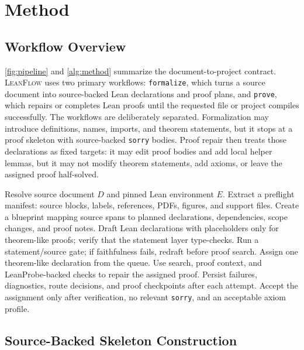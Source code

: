 \documentclass{article}
\newcommand{\method}{\textsc{LeanFlow}\xspace}
\newcommand{\lean}{Lean\xspace}
\begin{document}
\section{Method}

\subsection{Workflow Overview}

\cref{fig:pipeline} and \cref{alg:method} summarize the document-to-project contract.
\method uses two primary workflows: \texttt{formalize}, which turns a source document into source-backed \lean declarations and proof plans, and \texttt{prove}, which repairs or completes \lean proofs until the requested file or project compiles successfully.
The workflows are deliberately separated.
Formalization may introduce definitions, names, imports, and theorem statements, but it stops at a proof skeleton with source-backed \texttt{sorry} bodies.
Proof repair then treats those declarations as fixed targets: it may edit proof bodies and add local helper lemmas, but it may not modify theorem statements, add axioms, or leave the assigned proof half-solved.

\begin{algorithm}[t]
\caption{\method workflow contract}
\label{alg:method}
\begin{algorithmic}[1]
\STATE Resolve source document $D$ and pinned \lean environment $E$.
\STATE Extract a preflight manifest: source blocks, labels, references, PDFs, figures, and support files.
\STATE Create a blueprint mapping source spans to planned declarations, dependencies, scope changes, and proof notes.
  \STATE Draft \lean declarations with placeholders only for theorem-like proofs; verify that the statement layer type-checks.
\STATE Run a statement/source gate; if faithfulness fails, redraft before proof search.
  \STATE Assign one theorem-like declaration from the queue.
  \STATE Use search, proof context, and LeanProbe-backed checks to repair the assigned proof.
  \STATE Persist failures, diagnostics, route decisions, and proof checkpoints after each attempt.
  \STATE Accept the assignment only after verification, no relevant \texttt{sorry}, and an acceptable axiom profile.
\ENDWHILE
\end{algorithmic}
\end{algorithm}

\subsection{Source-Backed Skeleton Construction}
\end{document}
